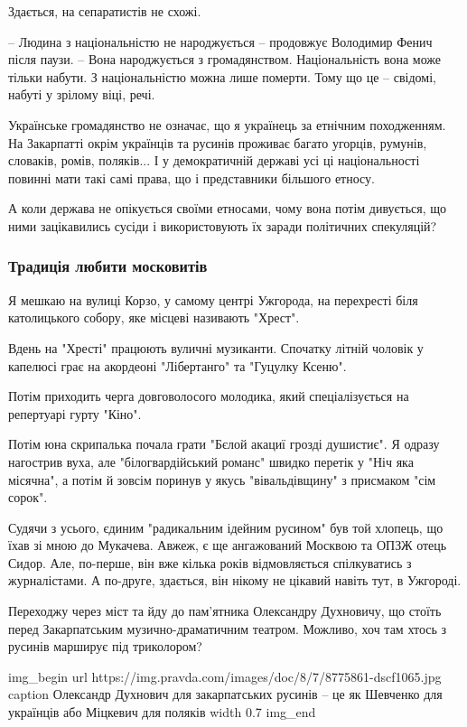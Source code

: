 Здається, на сепаратистів не схожі. 

– Людина з національністю не народжується – продовжує Володимир Фенич після
паузи. – Вона народжується з громадянством. Національність вона може тільки
набути. З національністю можна лише померти. Тому що це – свідомі, набуті у
зрілому віці, речі.

Українське громадянство не означає, що я українець за етнічним походженням. На
Закарпатті окрім українців та русинів проживає багато угорців, румунів,
словаків, ромів, поляків... І у демократичній державі усі ці національності
повинні мати такі самі права, що і представники більшого етносу.

А коли держава не опікується своїми етносами, чому вона потім дивується, що
ними зацікавились сусіди і використовують їх заради політичних спекуляцій?

\subsubsection{Традиція любити московитів}

Я мешкаю на вулиці Корзо, у самому центрі Ужгорода, на перехресті біля
католицького собору, яке місцеві називають "Хрест".

Вдень на "Хресті" працюють вуличні музиканти. Спочатку літній чоловік у
капелюсі грає на акордеоні "Лібертанго" та "Гуцулку Ксеню".

Потім приходить черга довговолосого молодика, який спеціалізується на
репертуарі гурту "Кіно".

Потім юна скрипалька почала грати "Бєлой акациї грозді душистиє". Я одразу
нагострив вуха, але "білогвардійський романс" швидко перетік у "Ніч яка
місячна", а потім й зовсім поринув у якусь "вівальдівщину" з присмаком "сім
сорок".

Судячи з усього, єдиним "радикальним ідейним русином" був той хлопець, що їхав
зі мною до Мукачева. Авжеж, є ще ангажований Москвою та ОПЗЖ отець Сидор. Але,
по-перше, він вже кілька років відмовляється спілкуватись з журналістами. А
по-друге, здається, він нікому не цікавий навіть тут, в Ужгороді.

Переходжу через міст та йду до пам’ятника Олександру Духновичу, що стоїть перед
Закарпатським музично-драматичним театром. Можливо, хоч там хтось з русинів
марширує під триколором?

\ifcmt
img_begin 
	url https://img.pravda.com/images/doc/8/7/8775861-dscf1065.jpg
	caption Олександр Духнович для закарпатських русинів – це як Шевченко для українців або Міцкевич для поляків
	width 0.7
img_end
\fi

